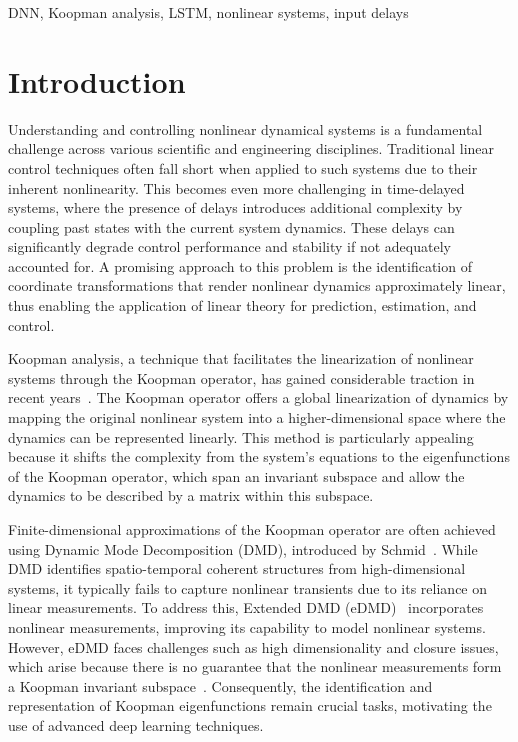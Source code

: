\documentclass[conference]{IEEEtran}
\begin{document}
\begin{IEEEkeywords}
    DNN, Koopman analysis, LSTM, nonlinear systems, input delays
\end{IEEEkeywords}

\section{Introduction}
Understanding and controlling nonlinear dynamical systems is a fundamental challenge across various scientific and engineering disciplines. Traditional linear control techniques often fall short when applied to such systems due to their inherent nonlinearity. This becomes even more challenging in time-delayed systems, where the presence of delays introduces additional complexity by coupling past states with the current system dynamics. These delays can significantly degrade control performance and stability if not adequately accounted for. A promising approach to this problem is the identification of coordinate transformations that render nonlinear dynamics approximately linear, thus enabling the application of linear theory for prediction, estimation, and control.

Koopman analysis, a technique that facilitates the linearization of nonlinear systems through the Koopman operator, has gained considerable traction in recent years~\cite{Mezic2004101, Mezić2005}. The Koopman operator offers a global linearization of dynamics by mapping the original nonlinear system into a higher-dimensional space where the dynamics can be represented linearly.
This method is particularly appealing because it shifts the complexity from the system's equations to the eigenfunctions of the Koopman operator, which span an invariant subspace and allow the dynamics to be described by a matrix within this subspace.

Finite-dimensional approximations of the Koopman operator are often achieved using Dynamic Mode Decomposition (DMD), introduced by Schmid~\cite{schmid2010dynamic}. While DMD identifies spatio-temporal coherent structures from high-dimensional systems, it typically fails to capture nonlinear transients due to its reliance on linear measurements. To address this, Extended DMD (eDMD)~\cite{williams2015data} incorporates nonlinear measurements, improving its capability to model nonlinear systems. However, eDMD faces challenges such as high dimensionality and closure issues, which arise because there is no guarantee that the nonlinear measurements form a Koopman invariant subspace~\cite{Lusch2018}. Consequently, the identification and representation of Koopman eigenfunctions remain crucial tasks, motivating the use of advanced deep learning techniques.
\end{document}
